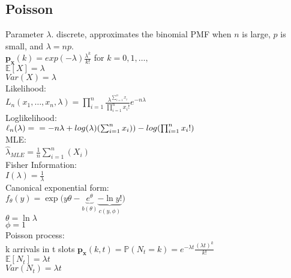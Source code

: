 \subsection*{Poisson}
Parameter $\lambda$. discrete, approximates the binomial PMF when $n$ is large, $p$ is small, and $\lambda = np$.\\
$\mathbf{p_x}(k)=exp(-\lambda)\frac{\lambda^k}{k!}$ for $k=0,1, \ldots,$\\
$\mathbb{E}[X]=\lambda$\\
$Var(X)=\lambda$\\
Likelihood:\\
$L_ n(x_1, \ldots , x_ n, \lambda) = \prod _{i = 1}^ n \frac{\lambda^{\sum_{i=1}^{n} x_i}}{\prod _{i = 1}^ n x_i!} e^{-n\lambda}$\\
Loglikelihood:\\
$\ell_n (\lambda)= \\
= -n\lambda + log(\lambda)(\sum_{i=1}^n x_i)) - log(\prod _{i = 1}^ n x_i!)$\\
MLE:\\
$\hat{\lambda}_{MLE} = \frac{1}{n} \sum^n_{i=1}(X_i)$\\
Fisher Information:\\
$I(\lambda)= \frac{1}{\lambda}$\\
Canonical exponential form:\\
$ f_{\theta}(y) = \exp\big(y\theta - \underbrace{e^\theta}_{b(\theta)} \underbrace{- \ln y!}_{c(y, \phi)}\big)$\\
$\theta = \ln \lambda$\\
$\phi = 1$\\
Poisson process:\\
k arrivals in t slots
$\mathbf{p_x}(k,t) = \mathbb{P}(N_t=k)=e^{-\lambda t} \frac{(\lambda t)^k}{k!}$\\
$\mathbb{E}[N_t]=\lambda t$\\
$Var(N_t)=\lambda t$ \\
